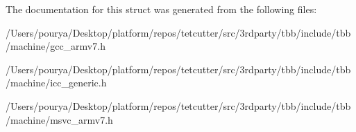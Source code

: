 The documentation for this struct was generated from the following files\+:\begin{DoxyCompactItemize}
\item 
/\+Users/pourya/\+Desktop/platform/repos/tetcutter/src/3rdparty/tbb/include/tbb/machine/gcc\+\_\+armv7.\+h\item 
/\+Users/pourya/\+Desktop/platform/repos/tetcutter/src/3rdparty/tbb/include/tbb/machine/icc\+\_\+generic.\+h\item 
/\+Users/pourya/\+Desktop/platform/repos/tetcutter/src/3rdparty/tbb/include/tbb/machine/msvc\+\_\+armv7.\+h\end{DoxyCompactItemize}
